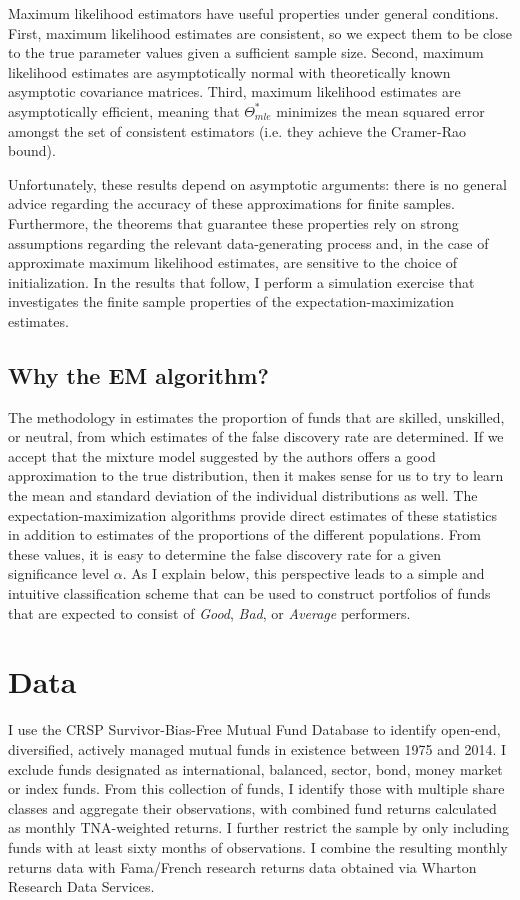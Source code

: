 		Maximum likelihood estimators have useful properties under general conditions. First, maximum likelihood estimates are consistent, so we expect them to be close to the true parameter values given a sufficient sample size. Second, maximum likelihood estimates are asymptotically normal with theoretically known asymptotic covariance matrices. Third, maximum likelihood estimates are asymptotically efficient, meaning that $\Theta_{mle}^*$ minimizes the mean squared error amongst the set of consistent estimators (i.e. they achieve the Cramer-Rao bound).

		Unfortunately, these results depend on asymptotic arguments: there is no general advice regarding the accuracy of these approximations for finite samples. Furthermore, the theorems that guarantee these properties rely on strong assumptions regarding the relevant data-generating process and, in the case of approximate maximum likelihood estimates, are sensitive to the choice of initialization.  In the results that follow, I perform a simulation exercise that investigates the finite sample properties of the expectation-maximization estimates.

	\subsection{Why the EM algorithm?}
		The methodology in \citet{Barras2010} estimates the proportion of funds that are skilled, unskilled, or neutral, from which estimates of the false discovery rate are determined. If we accept that the mixture model suggested by the authors offers a good approximation to the true distribution, then it makes sense for us to try to learn the mean and standard deviation of the individual distributions as well. The expectation-maximization algorithms provide direct estimates of these statistics in addition to estimates of the proportions of the different populations. From these values, it is easy to determine the false discovery rate for a given significance level $\alpha$. As I explain below, this perspective leads to a simple and intuitive classification scheme that can be used to construct portfolios of funds that are expected to consist of \textit{Good}, \textit{Bad}, or \textit{Average} performers.


\section{Data}
	I use the CRSP Survivor-Bias-Free Mutual Fund Database to identify open-end, diversified, actively managed mutual funds in existence between 1975 and 2014.  I exclude funds designated as international, balanced, sector, bond, money market or index funds.  From this collection of funds, I identify those with multiple share classes and aggregate their observations, with combined fund returns calculated as monthly TNA-weighted returns.  I further restrict the sample by only including funds with at least sixty months of observations.  I combine the resulting monthly returns data with Fama/French research returns data obtained via Wharton Research Data Services.

